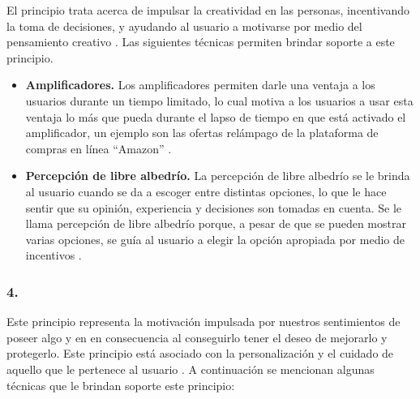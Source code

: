  El principio trata acerca de impulsar la creatividad en las personas, incentivando la toma de
 decisiones, y ayudando al usuario a motivarse por medio del pensamiento creativo
 \cite[p. 126]{Octalysis}. Las siguientes técnicas permiten brindar soporte a este principio.

    \begin{itemize}
    \item
    {\bf Amplificadores.}
        Los amplificadores permiten darle una ventaja a los usuarios durante un tiempo limitado,
        lo cual motiva a los usuarios a usar esta ventaja lo más que pueda durante el lapso de tiempo
        en que está activado el amplificador, un ejemplo son las ofertas relámpago de la plataforma
        de compras en línea ``Amazon'' \cite[p. 146]{Octalysis}.

    \item
    {\bf Percepción de libre albedrío.}
        La percepción de libre albedrío se le brinda al usuario cuando se da a escoger entre
        distintas opciones, lo que le hace sentir que su opinión, experiencia y decisiones son
        tomadas en cuenta. Se le llama percepción de libre albedrío porque, a pesar de que se
        pueden mostrar varias opciones, se guía al usuario a elegir la opción apropiada por medio
        de incentivos \cite[p. 150]{Octalysis}.
    \end{itemize}

\subsubsection{4. \principioIV} \label{subsec:principioIV}

 Este principio representa la motivación impulsada por nuestros sentimientos de poseer algo y en
 en consecuencia al conseguirlo tener el deseo de mejorarlo y protegerlo. %
 Este principio está asociado con la personalización y el cuidado de aquello que le pertenece al
 usuario \cite[p. 161]{Octalysis}. A continuación se mencionan algunas técnicas que le brindan
 soporte este principio:

